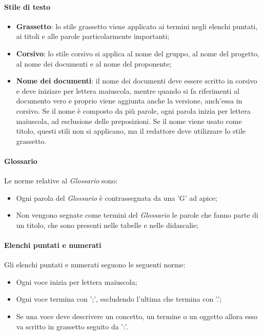\paragraph{Stile di testo}
\begin{itemize}

	\item \textbf{Grassetto}: lo stile grassetto viene applicato ai termini negli elenchi puntati, ai titoli e alle parole particolarmente importanti;
	
	\item \textbf{Corsivo}: lo stile corsivo si applica al nome del gruppo, al nome del progetto, al nome dei documenti e al nome del proponente;
	
	\item \textbf{Nome dei documenti}: il nome dei documenti deve essere scritto in corsivo e deve iniziare per lettera maiuscola, mentre quando si fa riferimenti al documento vero e proprio viene aggiunta anche la versione, anch'essa in corsivo. Se il nome è composto da più parole, ogni parola inizia per lettera maiuscola, ad esclusione delle preposizioni.  Se il nome viene usato come titolo, questi stili non si applicano, ma il redattore deve utilizzare lo stile grassetto.

\end{itemize}

\paragraph{Glossario}
Le norme relative al \textit{Glossario} sono:
\begin{itemize}

	\item Ogni parola del \textit{Glossario} è contrassegnata da una 'G' ad apice;
	
	\item Non vengono segnate come termini del \textit{Glossario} le parole che fanno parte di un titolo, che sono presenti nelle tabelle e nelle didascalie;

\end{itemize}

\paragraph{Elenchi puntati e numerati}
Gli elenchi puntati e numerati seguono le seguenti norme:
\begin{itemize}

	\item Ogni voce inizia per lettera maiuscola;
	
	\item Ogni voce termina con ';', escludendo l'ultima che termina con '.';
	
	\item Se una voce deve descrivere un concetto, un termine o un oggetto allora esso va scritto in grassetto seguito da ':'.
\end{itemize}


